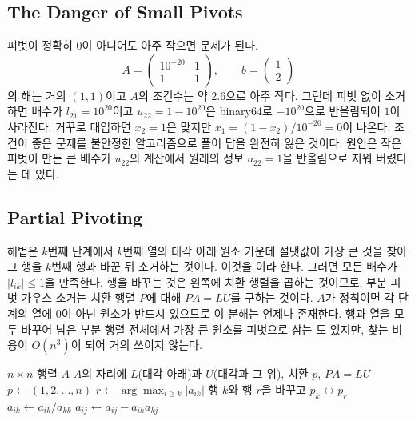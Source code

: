 \subsection{The Danger of Small Pivots}

피벗이 정확히 $0$이 아니어도 아주 작으면 문제가 된다.
\[
A=\begin{pmatrix}10^{-20}&1\\1&1\end{pmatrix},\qquad b=\begin{pmatrix}1\\2\end{pmatrix}
\]
의 해는 거의 $(1,1)$이고 $A$의 조건수는 약 $2.6$으로 아주 작다. 그런데 피벗 없이 소거하면 배수가 $l_{21}=10^{20}$이고 $u_{22}=1-10^{20}$은 binary64로 $-10^{20}$으로 반올림되어 $1$이 사라진다. 거꾸로 대입하면 $x_2=1$은 맞지만 $x_1=(1-x_2)/10^{-20}=0$이 나온다. 조건이 좋은 문제를 불안정한 알고리즘으로 풀어 답을 완전히 잃은 것이다. 원인은 작은 피벗이 만든 큰 배수가 $u_{22}$의 계산에서 원래의 정보 $a_{22}=1$을 반올림으로 지워 버렸다는 데 있다.

\subsection{Partial Pivoting}

해법은 $k$번째 단계에서 $k$번째 열의 대각 아래 원소 가운데 절댓값이 가장 큰 것을 찾아 그 행을 $k$번째 행과 바꾼 뒤 소거하는 것이다. 이것을 이라 한다. 그러면 모든 배수가 $|l_{ik}|\le1$을 만족한다. 행을 바꾸는 것은 왼쪽에 치환 행렬을 곱하는 것이므로, 부분 피벗 가우스 소거는 치환 행렬 $P$에 대해 $PA=LU$를 구하는 것이다. $A$가 정칙이면 각 단계의 열에 $0$이 아닌 원소가 반드시 있으므로 이 분해는 언제나 존재한다. 행과 열을 모두 바꾸어 남은 부분 행렬 전체에서 가장 큰 원소를 피벗으로 삼는 도 있지만, 찾는 비용이 $O(n^3)$이 되어 거의 쓰이지 않는다.

\begin{algorithm}[t]
\begin{algorithmic}[1]
\Require $n\times n$ 행렬 $A$
\Ensure $A$의 자리에 $L$(대각 아래)과 $U$(대각과 그 위), 치환 $p$, $PA=LU$
\State $p\gets(1,2,\dots,n)$
  \State $r\gets\arg\max_{i\ge k}|a_{ik}|$ 
  \State 행 $k$와 행 $r$을 바꾸고 $p_k\leftrightarrow p_r$
    \State $a_{ik}\gets a_{ik}/a_{kk}$ 
  \EndFor
    \State $a_{ij}\gets a_{ij}-a_{ik}a_{kj}$ 
  \EndFor
\EndFor
\end{algorithmic}
\caption{부분 피벗 LU 분해}
\label{alg:lu-pp}
\end{algorithm}

